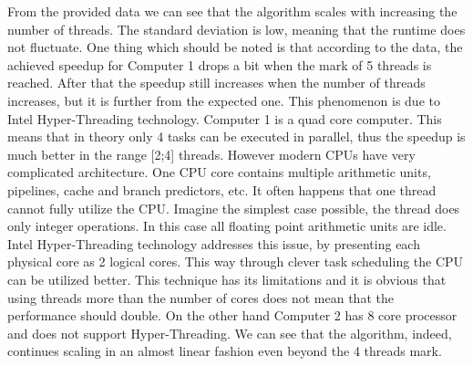 From the provided data we can see that the algorithm scales with increasing the number of threads. The standard deviation is low, meaning that the runtime does not fluctuate. One thing which should be noted is that according to the data, the achieved speedup for Computer 1 drops a bit when the mark of 5 threads is reached. After that the speedup still increases when the number of threads increases, but it is further from the expected one. This phenomenon is due to Intel Hyper-Threading technology. Computer 1 is a quad core computer. This means that in theory only 4 tasks can be executed in parallel, thus the speedup is much better in the range [2;4] threads. However modern CPUs have very complicated architecture. One CPU core contains multiple arithmetic units, pipelines, cache and branch predictors, etc. It often happens that one thread cannot fully utilize the CPU. Imagine the simplest case possible, the thread does only integer operations. In this case all floating point arithmetic units are idle. Intel Hyper-Threading technology addresses this issue, by presenting each physical core as 2 logical cores. This way through clever task scheduling the CPU can be utilized better. This technique has its limitations and it is obvious that using threads more than the number of cores does not mean that the performance should double. On the other hand Computer 2 has 8 core processor and does not support Hyper-Threading. We can see that the algorithm, indeed, continues scaling in an almost linear fashion even beyond the 4 threads mark.

